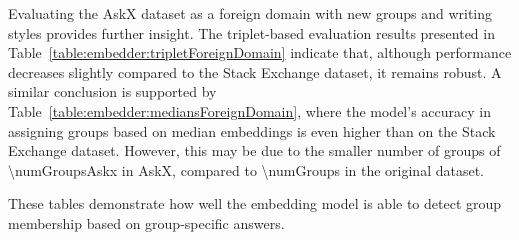Evaluating the AskX dataset as a foreign domain with new groups and writing styles provides further insight. The triplet-based evaluation results presented in Table~\ref{table:embedder:tripletForeignDomain} indicate that, although performance decreases slightly compared to the Stack Exchange dataset, it remains robust. A similar conclusion is supported by Table~\ref{table:embedder:mediansForeignDomain}, where the model's accuracy in assigning groups based on median embeddings is even higher than on the Stack Exchange dataset. However, this may be due to the smaller number of groups of \num{\numGroupsAskx} in AskX, compared to \num{\numGroups} in the original dataset.

\begin{table}[ht]
  \caption{These tables demonstrate how well the embedding model is able to detect group membership based on group-specific answers.}
  \begin{subtable}[t]{0.49\linewidth}
    \label{table:embedder:triplet}
    \resultEmbedder{}
  \end{subtable}
  \hfill
  \begin{subtable}[t]{0.49\linewidth}
    \label{table:embedder:medians}
    \resultEmbedderToMedians{}
  \end{subtable}
  \par\bigskip
  \begin{subtable}[t]{0.49\linewidth}
    \label{table:embedder:tripletForeignDomain}
    \resultEmbedderForeignDomain{}

\end{subtable}
\end{table}
